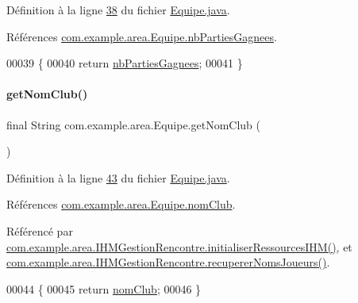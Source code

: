 Définition à la ligne \hyperlink{_equipe_8java_source_l00038}{38} du fichier \hyperlink{_equipe_8java_source}{Equipe.\+java}.



Références \hyperlink{_equipe_8java_source_l00025}{com.\+example.\+area.\+Equipe.\+nb\+Parties\+Gagnees}.


\begin{DoxyCode}
00039     \{
00040       \textcolor{keywordflow}{return} \hyperlink{classcom_1_1example_1_1area_1_1_equipe_af01e154be3aaa3fbcf909c3a44734b2e}{nbPartiesGagnees};
00041     \}
\end{DoxyCode}
\mbox{\label{classcom_1_1example_1_1area_1_1_equipe_a735e5e0aaac9ac2c17f3eca3d47862dc}} 
\paragraph{\texorpdfstring{get\+Nom\+Club()}{getNomClub()}}
{\footnotesize\ttfamily final String com.\+example.\+area.\+Equipe.\+get\+Nom\+Club (\begin{DoxyParamCaption}{ }\end{DoxyParamCaption})}



Définition à la ligne \hyperlink{_equipe_8java_source_l00043}{43} du fichier \hyperlink{_equipe_8java_source}{Equipe.\+java}.



Références \hyperlink{_equipe_8java_source_l00026}{com.\+example.\+area.\+Equipe.\+nom\+Club}.



Référencé par \hyperlink{_i_h_m_gestion_rencontre_8java_source_l00142}{com.\+example.\+area.\+I\+H\+M\+Gestion\+Rencontre.\+initialiser\+Ressources\+I\+H\+M()}, et \hyperlink{_i_h_m_gestion_rencontre_8java_source_l00281}{com.\+example.\+area.\+I\+H\+M\+Gestion\+Rencontre.\+recuperer\+Noms\+Joueurs()}.


\begin{DoxyCode}
00044     \{
00045       \textcolor{keywordflow}{return} \hyperlink{classcom_1_1example_1_1area_1_1_equipe_ac93205e041df88192dd6b1dfc8488e0a}{nomClub};
00046     \}
\end{DoxyCode}
\mbox{\label{classcom_1_1example_1_1area_1_1_equipe_aba16e2f2a922d1b2c4219dc6c865482c}} 
